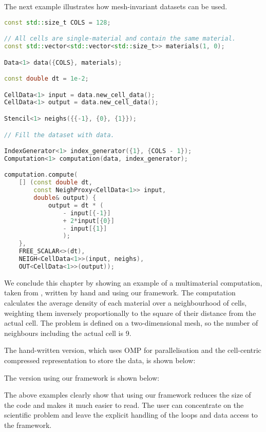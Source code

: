 \documentclass[fontsize=11pt, appendixprefix=true]{scrreprt}
\begin{document}
The next example illustrates how mesh-invariant datasets can be used.

\begin{lstlisting}[language=c++]
const std::size_t COLS = 128;

// All cells are single-material and contain the same material.
const std::vector<std::vector<std::size_t>> materials(1, 0);

Data<1> data({COLS}, materials);

const double dt = 1e-2;

CellData<1> input = data.new_cell_data();
CellData<1> output = data.new_cell_data();

Stencil<1> neighs({{-1}, {0}, {1}});

// Fill the dataset with data.

IndexGenerator<1> index_generator({1}, {COLS - 1});
Computation<1> computation(data, index_generator);

computation.compute(
    [] (const double dt,
        const NeighProxy<CellData<1>> input,
        double& output) {
            output = dt * (
                - input[{-1}]
                + 2*input[{0}]
                - input[{1}]
                );
	},
	FREE_SCALAR<>(dt),
	NEIGH<CellData<1>>(input, neighs),
	OUT<CellData<1>>(output));
\end{lstlisting}

We conclude this chapter by showing an example of a multimaterial computation,
taken from \cite{osti_1341844}, written by hand and using our framework. The
computation calculates the average density of each material over a neighbourhood
of cells, weighting them inversely proportionally to the square of their
distance from the actual cell. The problem is defined on a two-dimensional mesh,
so the number of neighbours including the actual cell is 9.

The hand-written version, which uses OMP for parallelisation and the
cell-centric compressed representation to store the data, is shown below:



The version using our framework is shown below:



The above examples clearly show that using our framework reduces the size of the
code and makes it much easier to read. The user can concentrate on the
scientific problem and leave the explicit handling of the loops and data access
to the framework.
\end{document}

